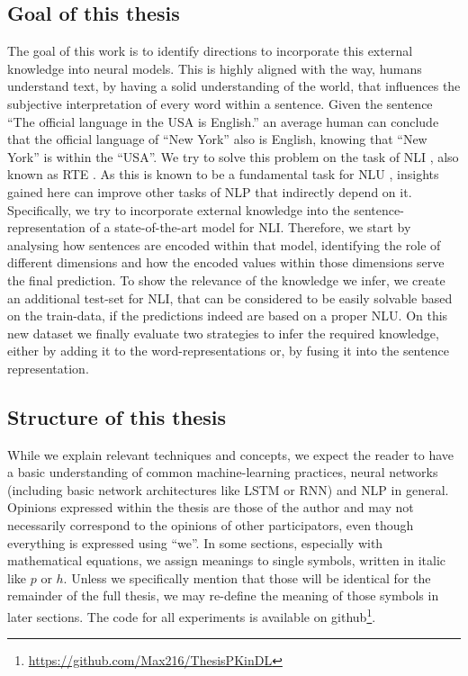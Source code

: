 \subsection{Goal of this thesis}
The goal of this work is to identify directions to incorporate this external knowledge into neural models. This is highly aligned with the way, humans understand text, by having a solid understanding of the world, that influences the subjective interpretation of every word within a sentence. Given the sentence ``The official language in the USA is English.'' an average human can conclude that the official language of ``New York'' also is English, knowing that ``New York'' is within the ``USA''. We try to solve this problem on the task of \ac{NLI} \citep{bowman2015large}, also known as \ac{RTE} \citep{dagan2006pascal}. As this is known to be a fundamental task for \ac{NLU} \citep{maccartney2007natural}, insights gained here can improve other tasks of \ac{NLP} that indirectly depend on it. Specifically, we try to incorporate external knowledge into the sentence-representation of a state-of-the-art model for \ac{NLI}. Therefore, we start by analysing how sentences are encoded within that model, identifying the role of different dimensions and how the encoded values within those dimensions serve the final prediction. To show the relevance of the knowledge we infer, we create an additional test-set for \ac{NLI}, that can be considered to be easily solvable based on the train-data, if the predictions indeed are based on a proper \ac{NLU}. On this new dataset we finally evaluate two strategies to infer the required knowledge, either by adding it to the word-representations or, by fusing it into the sentence representation.

\subsection{Structure of this thesis}
While we explain relevant techniques and concepts, we expect the reader to have a basic understanding of common machine-learning practices, neural networks (including basic network architectures like \ac{LSTM} or \ac{RNN}) and \ac{NLP} in general. Opinions expressed within the thesis are those of the author and may not necessarily correspond to the opinions of other participators, even though everything is expressed using ``we''. In some sections, especially with mathematical equations, we assign meanings to single symbols, written in italic like $p$ or $h$. Unless we specifically mention that those will be identical for the remainder of the full thesis, we may re-define the meaning of those symbols in later sections. The code for all experiments is available on github\footnote{\href{https://github.com/Max216/ThesisPKinDL}{https://github.com/Max216/ThesisPKinDL}}.
\newline

